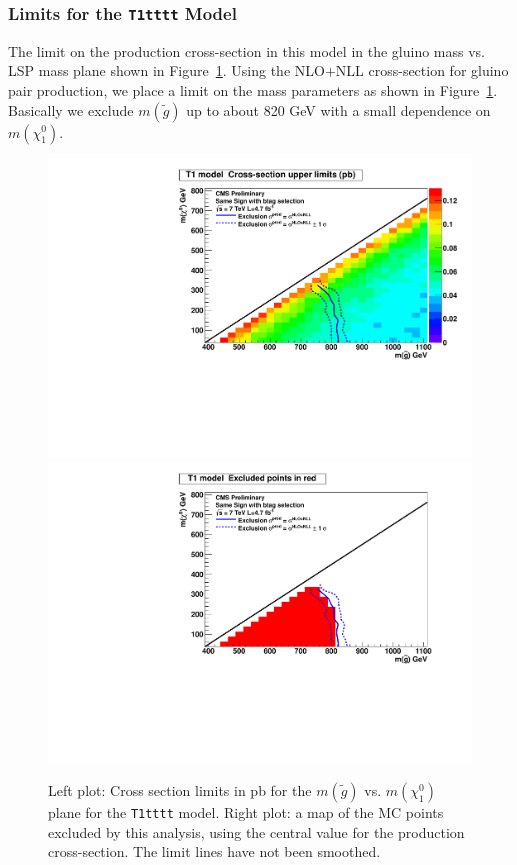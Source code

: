 \subsubsection{Limits for the {\tt T1tttt} Model}
\label{sec:t1ttttlimits}
The limit on the production cross-section in this model in the 
gluino mass vs. LSP mass plane shown in Figure~\ref{fig:T1ttttLimit}.  
Using the 
NLO$+$NLL cross-section for gluino pair production, we place a limit
on the mass parameters as shown in Figure~\ref{fig:T1ttttLimit}.
Basically we exclude 
$m(\widetilde{g})$ up to about 820 GeV with a small dependence on 
$m(\chi_1^0)$.

\begin{figure}[htb]
\begin{center}
\includegraphics[width=0.48\linewidth]{figs/T1tttt_LimitsOnCarpet.pdf}
\includegraphics[width=0.48\linewidth]{figs/T1tttt_ExcludedRegionMap.pdf}
\caption{
Left plot: Cross section limits in pb for the $m(\widetilde{g})$ vs. 
$m(\chi_1^0)$ plane for the
{\tt T1tttt} model.  Right plot: a map of the MC points excluded by this
analysis, using the central value for the production cross-section.
The limit lines have not been smoothed.\label{fig:T1ttttLimit}}
\end{center}
\end{figure}



